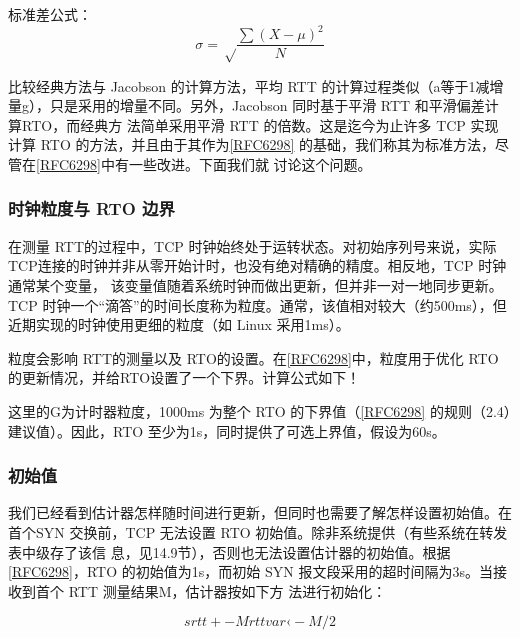 \begin{tcolorbox}
  标准差公式：
  \begin{equation}
    \sigma = \sqrt\frac{\sum{(X-\mu)^2}}{N}
  \end{equation}
\end{tcolorbox}
比较经典方法与 Jacobson 的计算方法，平均 RTT 的计算过程类似（a等于1减增量g），只是采用的增量不同。另外，Jacobson
同时基于平滑 RTT 和平滑偏差计算RTO，而经典方
法简单采用平滑 RTT 的倍数。这是迄今为止许多 TCP 实现计算 RTO
的方法，并且由于其作为\href{https://www.rfc-editor.org/rfc/rfc6298}{[RFC6298]}
的基础，我们称其为标准方法，尽管在\href{https://www.rfc-editor.org/rfc/rfc6298}{[RFC6298]}中有一些改进。下面我们就
讨论这个问题。

\subsubsection{时钟粒度与 RTO 边界}

在测量 RTT的过程中，TCP
时钟始终处于运转状态。对初始序列号来说，实际TCP连接的时钟并非从零开始计时，也没有绝对精确的精度。相反地，TCP 时钟通常某个变量，
该变量值随着系统时钟而做出更新，但并非一对一地同步更新。TCP
时钟一个“滴答”的时间长度称为粒度。通常，该值相对较大（约500ms），但近期实现的时钟使用更细的粒度（如
Linux 采用1ms）。

粒度会影响 RTT的测量以及
RTO的设置。在\href{https://www.rfc-editor.org/rfc/rfc6298}{[RFC6298]}中，粒度用于优化
RTO 的更新情况，并给RTO设置了一个下界。计算公式如下！

这里的G为计时器粒度，1000ms 为整个 RTO
的下界值（\href{https://www.rfc-editor.org/rfc/rfc6298}{[RFC6298]}
的规则（2.4）建议值）。因此，RTO 至少为1s，同时提供了可选上界值，假设为60s。

\subsubsection{初始值}

我们已经看到估计器怎样随时间进行更新，但同时也需要了解怎样设置初始值。在首个SYN 交换前，TCP 无法设置 RTO
初始值。除非系统提供（有些系统在转发表中级存了该信
息，见14.9节），否则也无法设置估计器的初始值。根据\href{https://www.rfc-editor.org/rfc/rfc6298}{[RFC6298]}，RTO
的初始值为1s，而初始 SYN 报文段采用的超时间隔为3s。当接收到首个 RTT 测量结果M，估计器按如下方
法进行初始化：

\begin{equation}
  srtt +- M
  rttvar ‹- M/2
\end{equation}


